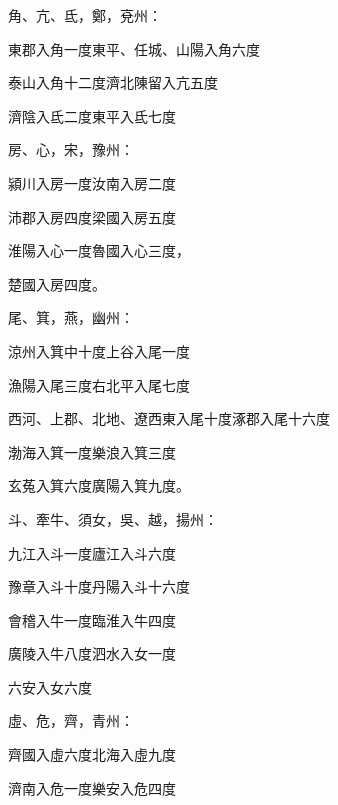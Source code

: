 \begin{pinyinscope}
{{ 角、亢、氐，鄭，兗州：



 東郡入角一度東平、任城、山陽入角六度



 泰山入角十二度濟北陳留入亢五度



 濟陰入氐二度東平入氐七度



 房、心，宋，豫州：



 潁川入房一度汝南入房二度



 沛郡入房四度梁國入房五度



 淮陽入心一度魯國入心三度，



 楚國入房四度。



 尾、箕，燕，幽州：



 涼州入箕中十度上谷入尾一度



 漁陽入尾三度右北平入尾七度



 西河、上郡、北地、遼西東入尾十度涿郡入尾十六度



 渤海入箕一度樂浪入箕三度



 玄菟入箕六度廣陽入箕九度。



 斗、牽牛、須女，吳、越，揚州：



 九江入斗一度廬江入斗六度



 豫章入斗十度丹陽入斗十六度



 會稽入牛一度臨淮入牛四度



 廣陵入牛八度泗水入女一度



 六安入女六度



 虛、危，齊，青州：



 齊國入虛六度北海入虛九度



 濟南入危一度樂安入危四度



}}
\end{pinyinscope}
